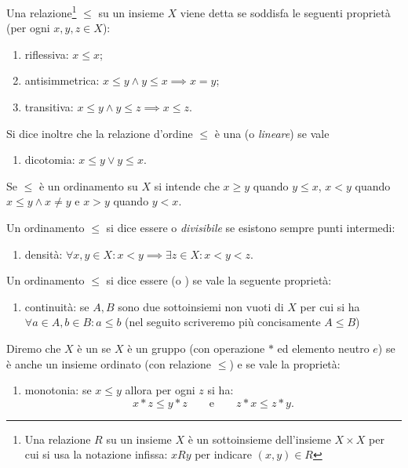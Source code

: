 \begin{definition}
Una relazione\footnote{%
Una relazione $R$ su un insieme $X$ è un sottoinsieme
dell'insieme $X\times X$ per cui si usa la notazione infissa:
$xRy$ per indicare $(x,y)\in R$}
$\le$ su un insieme $X$ viene detta
se soddisfa le seguenti proprietà (per ogni $x,y,z\in X$):
\begin{enumerate}
  \item[1.] riflessiva: $x\le x$;
  \item[2.] antisimmetrica: $x\le y \land y\le x \implies x=y$;
  \item[3.] transitiva: $x\le y \land y\le z \implies x\le z$.
\end{enumerate}
Si dice inoltre che la relazione d'ordine $\le$
è una  (o \emph{lineare}) 
se vale
\begin{enumerate}
  \item[4.] dicotomia: $x\le y \lor y\le x$.
\end{enumerate}

Se $\le$ è un ordinamento su $X$ si intende che
$x\ge y$ quando $y\le x$, $x < y$ quando $x\le y \land x\neq y$
e $x>y$ quando $y<x$.

Un ordinamento $\le$ si dice essere
 o \emph{divisibile} 
se esistono sempre punti intermedi:
\begin{enumerate}
  \item[5.] densità: $\forall x,y\in X\colon x<y \implies \exists z \in X\colon x < y < z$.
\end{enumerate}

Un ordinamento $\le$ si dice essere
(o ) se vale la seguente proprietà:
\begin{enumerate}
  \item[6.] continuità: se $A,B$ sono due sottoinsiemi non vuoti di $X$
  per cui si ha $\forall a\in A, b\in B\colon a\le b$
  (nel seguito scriveremo più concisamente $A\le B$)
\end{enumerate}
\end{definition}

\begin{definition}
  Diremo che $X$ è un  se $X$ è un gruppo
  (con operazione $*$ ed elemento neutro $e$) 
  se è anche un insieme ordinato (con relazione $\le$)
  e se vale la proprietà:
  \begin{enumerate}
    \item[1.] monotonia: se $x\le y$ allora per ogni $z$ si ha:
     \[
     x*z \le y*z \qquad\text{e}\qquad z*x \le z*y.
     \] 
  \end{enumerate}
\end{definition}

